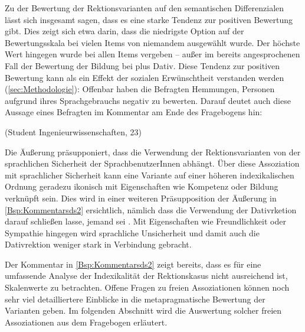 Zu der Bewertung der Rektionsvarianten auf den semantischen Differenzialen lässt sich insgesamt sagen, dass es eine starke Tendenz zur positiven Bewertung gibt. 
Dies zeigt sich etwa darin, dass die niedrigste Option auf der Bewertungsskala bei vielen Items von niemandem ausgewählt wurde. 
Der höchste Wert hingegen wurde bei allen Items vergeben -- außer im bereits angesprochenen Fall der Bewertung der Bildung bei \waehrend{} plus Dativ. 
Diese Tendenz zur positiven Bewertung kann als ein Effekt der sozialen Erwünschtheit verstanden werden (\autoref{sec:Methodologie}): 
Offenbar haben die Befragten Hemmungen, Personen aufgrund ihres Sprachgebrauchs negativ zu bewerten.
Darauf deutet auch diese Aussage eines Befragten im Kommentar am Ende des Fragebogens hin:
\begin{exe}
\ex {} (Student Ingenieurwissenschaften, 23)
\label{Bsp:Kommentarsds2}
\end{exe}
Die Äußerung präsupponiert, dass die Verwendung der Rektionsvarianten von der sprachlichen Sicherheit der SprachbenutzerInnen abhängt. 
Über diese Assoziation mit sprachlicher Sicherheit kann eine Variante auf einer höheren indexikalischen Ordnung geradezu ikonisch mit Eigenschaften wie Kompetenz oder Bildung verknüpft sein. 
Dies wird in einer weiteren Präsupposition der Äußerung in \autoref{Bsp:Kommentarsds2} ersichtlich, nämlich dass die Verwendung der Dativrketion darauf schließen lasse, jemand sei . 
Mit Eigenschaften wie Freundlichkeit oder Sympathie hingegen wird sprachliche Unsicherheit und damit auch die Dativrektion weniger stark in Verbindung gebracht. 

Der Kommentar in \autoref{Bsp:Kommentarsds2} zeigt bereits, dass es für eine umfassende Analyse der Indexikalität der Rektionskasus nicht ausreichend ist, Skalenwerte zu betrachten. 
Offene Fragen zu freien Assoziationen können noch sehr viel detailliertere Einblicke in die metapragmatische Bewertung der Varianten geben. 
Im folgenden Abschnitt wird die Auswertung solcher freien Assoziationen aus dem Fragebogen erläutert. 
